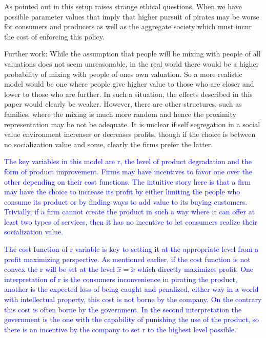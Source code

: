 \documentclass{article}
\begin{document}
As pointed out in \cite{CRP91} this setup raises strange ethical questions. When we have possible parameter values that imply that higher pursuit of pirates may be worse for consumers and producers as well as the aggregate society which must incur the cost of enforcing this policy. 

Further work: 
While the assumption that people will be mixing with people of all valuations does not seem unreasonable, in the real world there would be a higher probability of mixing with people of ones own valuation. So a more realistic model would be one where people give higher value to those who are closer and lower to those who are further. In such a situation, the effects described in this paper would clearly be weaker. However, there are other structures, such as families, where the mixing is much more random and hence the proximity representation may be not be adequate. It is unclear if self segregation in a social value environment increases or decreases profits, though if the choice is between no socialization value and some, clearly the firms prefer the latter.

\textcolor{blue}{
The key variables in this model are r, the level of product degradation and the form of product improvement. Firms may have incentives to favor one over the other depending on their cost functions. The intuitive story here is that a firm may have the choice to increase its profit by either limiting the people who consume its product or by finding ways to add value to its buying customers. Trivially, if a firm cannot create the product in such a way where it can offer at least two types of services, then it has no incentive to let consumers realize their socialization value. }

\textcolor{blue}{
The cost function of r variable is key to setting it at the appropriate level from a profit maximizing perspective. As mentioned earlier, if the cost function is not convex the r will be set at the level $\hat{x}=\check{x}$ which directly maximizes profit. One interpretation of r is the consumers inconvenience in pirating the product, another is the expected loss of being caught and penalized, either way in a world with intellectual property, this cost is not borne by the company. On the contrary this cost is often borne by the government. In the second interpretation the government is the one with the capability of punishing the use of the product, so there is an incentive by the company to set r to the highest level possible. }
\end{document}
